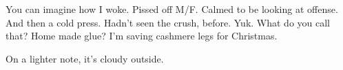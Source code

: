 

You can imagine how I woke.  Pissed off M/F.  Calmed to be looking at
offense.  And then a cold press.  Hadn't seen the crush, before.  Yuk.
What do you call that?  Home made glue?  I'm saving cashmere legs for
Christmas.

On a lighter note, it's cloudy outside.

\bye
